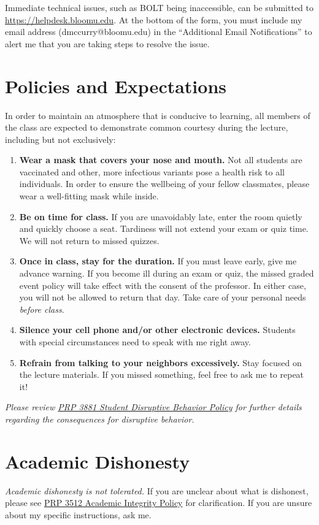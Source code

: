 \documentclass[11pt,letterpaper]{article}
\begin{document}
Immediate technical issues, such as BOLT being inaccessible, can be submitted to
\url{https://helpdesk.bloomu.edu}. At the bottom of the form, you must include
my email address (dmccurry@bloomu.edu) in the ``Additional Email Notifications''
to alert me that you are taking steps to resolve the issue.

\section{Policies and Expectations}
In order to maintain an atmosphere that is conducive to learning, all members
of the class are expected to demonstrate common courtesy during the lecture,
including but not exclusively:
\begin{enumerate}
	\item \textbf{Wear a mask that covers your nose and mouth.} Not all
		students are vaccinated and other, more infectious variants pose
		a health risk to all individuals. In order to ensure the
		wellbeing of your fellow classmates, please wear a well-fitting
		mask while inside.
	\item \textbf{Be on time for class.} If you are unavoidably late, enter
		the room quietly and quickly choose a seat.  Tardiness will not
		extend your exam or quiz time. We will not return to missed
		quizzes.
	\item \textbf{Once in class, stay for the duration.} If you must leave
		early, give me advance warning. If you become ill during an exam
		or quiz, the missed graded event policy will take effect with
		the consent of the professor. In either case, you will not be
		allowed to return that day. Take care of your personal needs
		\emph{before class}.
	\item \textbf{Silence your cell phone and/or other electronic devices.}
		Students with special circumstances need to speak with me right
		away.
	\item \textbf{Refrain from talking to your neighbors excessively.} Stay
		focused on the lecture materials. If you missed something, feel
		free to ask me to repeat it!
\end{enumerate}
\emph{Please review
\href{https://www.bloomu.edu/prp-3881-student-disruptive-behavior-policy}{PRP 3881 Student
Disruptive Behavior Policy} for further details regarding the consequences for
disruptive behavior.}

\section{Academic Dishonesty}
\emph{Academic dishonesty is not tolerated.} If you are unclear about what is
dishonest, please see 
\href{https://www.bloomu.edu/prp-3512-academic-integrity-policy}{PRP 3512 
Academic Integrity Policy} for clarification. If you are unsure about my
specific instructions, ask me.
\end{document}
